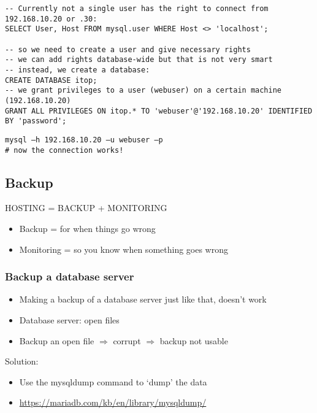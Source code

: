 \documentclass{article}
\begin{document}
\begin{verbatim}
-- Currently not a single user has the right to connect from 192.168.10.20 or .30:
SELECT User, Host FROM mysql.user WHERE Host <> 'localhost';

-- so we need to create a user and give necessary rights
-- we can add rights database-wide but that is not very smart
-- instead, we create a database:
CREATE DATABASE itop;
-- we grant privileges to a user (webuser) on a certain machine (192.168.10.20)
GRANT ALL PRIVILEGES ON itop.* TO 'webuser'@'192.168.10.20' IDENTIFIED BY 'password';
\end{verbatim}

\begin{verbatim}
mysql –h 192.168.10.20 –u webuser –p
# now the connection works!
\end{verbatim}


\subsection{Backup}

HOSTING = BACKUP + MONITORING

\begin{itemize}
    \item Backup = for when things go wrong
    \item Monitoring = so you know when something goes wrong
\end{itemize}

\subsubsection{Backup a database server}

\begin{itemize}
    \item Making a backup of a database server just like that, doesn't work
    \item Database server: open files
    \item Backup an open file $\Rightarrow$ corrupt $\Rightarrow$ backup not usable
\end{itemize}

Solution: 

\begin{itemize}
    \item Use the mysqldump command to `dump' the data
    \item \url{https://mariadb.com/kb/en/library/mysqldump/}
\end{itemize}
\end{document}

